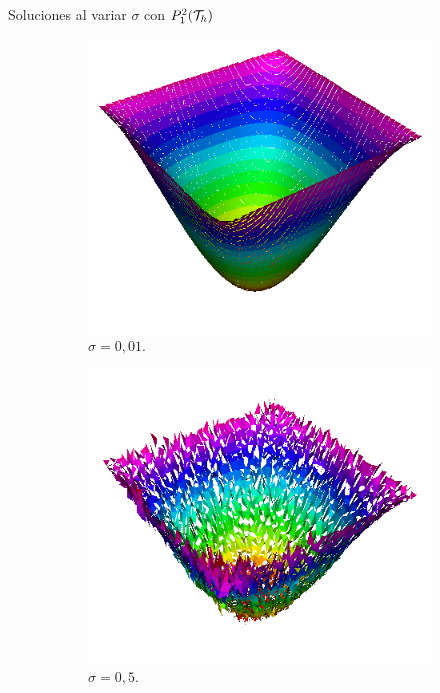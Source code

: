 		\begin{frame}{Soluciones al variar $\sigma$ con $\relax{P}_1^2(\mathcal{T}_h)$}
		
		\begin{figure}[h!]
			\begin{subfigure}[b]{0.27\textwidth}
				\centering
				\includegraphics[scale=0.20]{img/Difusion/Recortes/steady_diffusion_approx_sigma_0_01.png}
				\caption{$\sigma=0,01$.}
			\end{subfigure}
			\begin{subfigure}[b]{0.27\textwidth}
				\centering
				\includegraphics[scale=0.20]{img/Difusion/Recortes/steady_diffusion_approx_sigma_0_5.png}
				\caption{$\sigma=0,5$.}
			\end{subfigure}
			\begin{subfigure}[b]{0.27\textwidth}

\end{subfigure}
\end{figure}
\end{frame}
